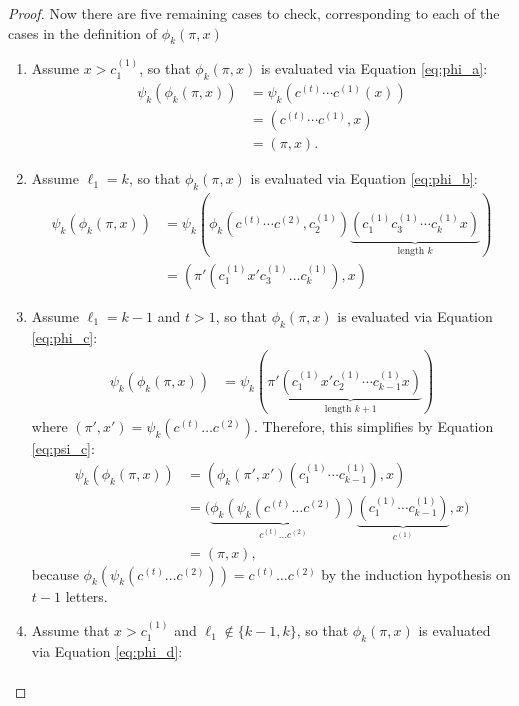 \begin{proof}
  Now there are five remaining cases to check, corresponding to each of the
  cases in the definition of $\phi_k(\pi, x)$
   \begin{enumerate}[leftmargin=*, label={\textbf{Case \arabic*.}}]
    \item Assume $x > c_1^{(1)}$, so that $\phi_k(\pi,x)$ is evaluated via Equation \ref{eq:phi_a}: \begin{align}
      \psi_k(\phi_k(\pi, x))
      &= \psi_k(c^{(t)}\cdots c^{(1)}(x)) \\
      &= (c^{(t)}\cdots c^{(1)},x) \\
      &= (\pi, x).
    \end{align}
    \item Assume $\ell_1 = k$, so that $\phi_k(\pi,x)$ is evaluated via Equation \ref{eq:phi_b}:\begin{align}
      \psi_k(\phi_k(\pi, x))
      &= \psi_k(\phi_k(c^{(t)} \cdots c^{(2)}, c^{(1)}_2)
      \underbrace{
        (c^{(1)}_1 c^{(1)}_3 \cdots c^{(1)}_{k} x)
      }_{\text{length } k}) \\
      &= (\pi'(c^{(1)}_1x'c^{(1)}_3 \dots c^{(1)}_k), x)
    \end{align}
    \item Assume $\ell_1 = k - 1$ and $t > 1$, so that $\phi_k(\pi,x)$ is evaluated via Equation \ref{eq:phi_c}:  \begin{align}
      \psi_k(\phi_k(\pi, x))
      &= \psi_k(\pi'
        \underbrace{
          (c^{(1)}_1 x' c^{(1)}_2\cdots c^{(1)}_{k-1} x)
        }_{\text{length } k + 1}
      )
    \end{align} where $(\pi', x') = \psi_k(c^{(t)} \dots c^{(2)})$.
    Therefore, this simplifies by Equation \ref{eq:psi_c}: \begin{align}
      \psi_k(\phi_k(\pi, x)) &= \left(
        \phi_k(\pi', x')
        (c^{(1)}_1 \cdots c^{(1)}_{k-1}),
        x
      \right) \\
      &= \Big(
        \underbrace{
          \phi_k(\psi_k(c^{(t)} \dots c^{(2)}))
        }_{c^{(t)} \dots c^{(2)}}
        \underbrace{
          (c^{(1)}_1 \cdots c^{(1)}_{k-1})
        }_{c^{(1)}},
        x
      \Big) \\
      &= (\pi, x),
    \end{align} because $\phi_k(\psi_k(c^{(t)} \dots c^{(2)})) = c^{(t)} \dots c^{(2)}$
    by the induction hypothesis on $t-1$ letters.
    \item Assume that $x > c_1^{(1)}$ and $\ell_1 \not\in \{k-1,k\}$, so that $\phi_k(\pi,x)$ is evaluated via Equation \ref{eq:phi_d}: \begin{align}

\end{align}
\end{enumerate}
\end{proof}
